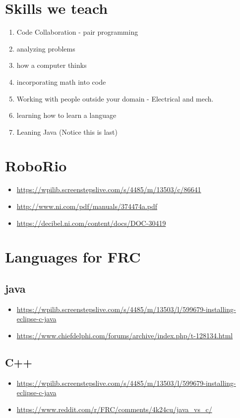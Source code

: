 \documentclass{article}
\begin{document}
\section{Skills we teach}
\begin{enumerate}
    \item Code Collaboration - pair programming
    \item analyzing problems
    \item how a computer thinks
    \item incorporating math into code
    \item Working with people outside your domain - Electrical and mech.
    \item learning how to learn a language
    \item Leaning Java (Notice this is last)
\end{enumerate}


\section{RoboRio}
\begin{itemize}
\item[] \url{https://wpilib.screenstepslive.com/s/4485/m/13503/c/86641}
\item[] \url{http://www.ni.com/pdf/manuals/374474a.pdf}
\item[] \url{https://decibel.ni.com/content/docs/DOC-30419}
\end{itemize}

\section{Languages for FRC}
\subsection{java}
\begin{itemize}
\item[] \url{https://wpilib.screenstepslive.com/s/4485/m/13503/l/599679-installing-eclipse-c-java}
\item[] \url{https://www.chiefdelphi.com/forums/archive/index.php/t-128134.html}
\end{itemize}

\subsection{C++}
\begin{itemize}
\item[] \url{https://wpilib.screenstepslive.com/s/4485/m/13503/l/599679-installing-eclipse-c-java}
\item[] \url{https://www.reddit.com/r/FRC/comments/4k24cu/java_vs_c/}
\end{itemize}
\end{document}
